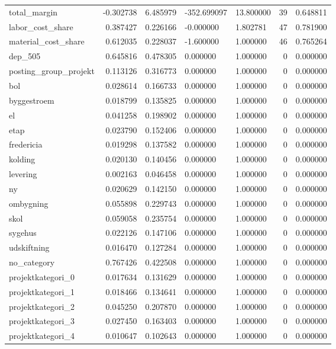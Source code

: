 \begin{landscape}
\begin{longtable}[h!]{lrrllrr}
total_margin & -0.302738 & 6.485979 & -352.699097 & 13.800000 & 39 & 0.648811 \\
labor_cost_share & 0.387427 & 0.226166 & -0.000000 & 1.802781 & 47 & 0.781900 \\
material_cost_share & 0.612035 & 0.228037 & -1.600000 & 1.000000 & 46 & 0.765264 \\
dep_505 & 0.645816 & 0.478305 & 0.000000 & 1.000000 & 0 & 0.000000 \\
posting_group_projekt & 0.113126 & 0.316773 & 0.000000 & 1.000000 & 0 & 0.000000 \\
bol & 0.028614 & 0.166733 & 0.000000 & 1.000000 & 0 & 0.000000 \\
byggestroem & 0.018799 & 0.135825 & 0.000000 & 1.000000 & 0 & 0.000000 \\
el & 0.041258 & 0.198902 & 0.000000 & 1.000000 & 0 & 0.000000 \\
etap & 0.023790 & 0.152406 & 0.000000 & 1.000000 & 0 & 0.000000 \\
fredericia & 0.019298 & 0.137582 & 0.000000 & 1.000000 & 0 & 0.000000 \\
kolding & 0.020130 & 0.140456 & 0.000000 & 1.000000 & 0 & 0.000000 \\
levering & 0.002163 & 0.046458 & 0.000000 & 1.000000 & 0 & 0.000000 \\
ny & 0.020629 & 0.142150 & 0.000000 & 1.000000 & 0 & 0.000000 \\
ombygning & 0.055898 & 0.229743 & 0.000000 & 1.000000 & 0 & 0.000000 \\
skol & 0.059058 & 0.235754 & 0.000000 & 1.000000 & 0 & 0.000000 \\
sygehus & 0.022126 & 0.147106 & 0.000000 & 1.000000 & 0 & 0.000000 \\
udskiftning & 0.016470 & 0.127284 & 0.000000 & 1.000000 & 0 & 0.000000 \\
no_category & 0.767426 & 0.422508 & 0.000000 & 1.000000 & 0 & 0.000000 \\
projektkategori_0 & 0.017634 & 0.131629 & 0.000000 & 1.000000 & 0 & 0.000000 \\
projektkategori_1 & 0.018466 & 0.134641 & 0.000000 & 1.000000 & 0 & 0.000000 \\
projektkategori_2 & 0.045250 & 0.207870 & 0.000000 & 1.000000 & 0 & 0.000000 \\
projektkategori_3 & 0.027450 & 0.163403 & 0.000000 & 1.000000 & 0 & 0.000000 \\
projektkategori_4 & 0.010647 & 0.102643 & 0.000000 & 1.000000 & 0 & 0.000000 \\

\end{longtable}
\end{landscape}
